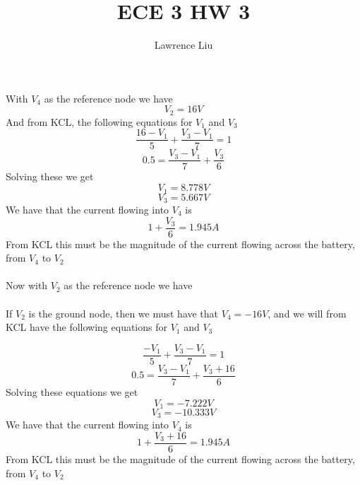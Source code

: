 \documentclass[12pt]{article}
\title{ECE 3 HW 3}
\author{Lawrence Liu}
\begin{document}
\maketitle
With $V_4$ as the reference node we have
$$V_2=16V$$
And from KCL, the following equations for $V_1$ and $V_3$
$$\frac{16-V_1}{5}+\frac{V_3-V_1}{7}=1$$
$$0.5=\frac{V_3-V_1}{7}+\frac{V_3}{6}$$
Solving these we get
$$V_1=8.778V$$
$$V_3=5.667V$$
We have that the current flowing into $V_4$ is 
$$1+\frac{V_3}{6}=\boxed{1.945A}$$
From KCL this must be the magnitude of the current flowing across the battery, from $V_4$ to $V_2$\\\\
Now with $V_2$ as the reference node we have\\\\
If $V_2$ is the ground node, then we must have that $V_4=-16V$, and we will from KCL have the following equations for $V_1$ and $V_3$

$$\frac{-V_1}{5}+\frac{V_3-V_1}{7}=1$$
$$0.5=\frac{V_3-V_1}{7}+\frac{V_3+16}{6}$$
Solving these equations we get
$$V_1=-7.222V$$
$$V_3=-10.333V$$
We have that the current flowing into $V_4$ is 
$$1+\frac{V_3+16}{6}=\boxed{1.945A}$$From KCL this must be the magnitude of the current flowing across the battery, from $V_4$ to $V_2$
\end{document}
